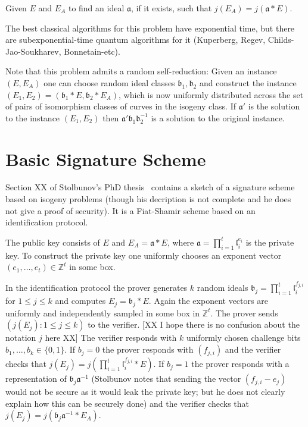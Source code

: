 \documentclass{llncs}
\newcommand{\Z}{\mathbb{Z}}
\renewcommand{\a}{\mathfrak{a}}
\renewcommand{\b}{\mathfrak{b}}
\renewcommand{\l}{\mathfrak{l}}
\begin{document}
\begin{definition}\label{defn:ass1}
Given $E$ and $E_A$ to find an ideal $\a$, if it exists, such that $j( E_A ) = j( \a * E )$.
\end{definition}

The best classical algorithms for this problem have exponential time, but there are subexponential-time quantum algorithms for it (Kuperberg, Regev, Childs-Jao-Soukharev, Bonnetain-etc).

Note that this problem admits a random self-reduction: Given an instance $(E, E_A)$ one can choose random ideal classes $\b_1, \b_2$ and construct the instance $(E_1, E_2) = (\b_1 * E, \b_2 * E_A )$, which is now uniformly distributed across the set of pairs of isomorphism classes of curves in the isogeny class.
If $\a'$ is the solution to the instance $(E_1, E_2)$ then $\a'\b_1 \b_2^{-1}$ is a solution to the original instance.


\section{Basic Signature Scheme}

Section XX of Stolbunov's PhD thesis~\cite{Sto12} contains a sketch of a signature scheme based on isogeny problems (though his decription is not complete and he does not give a proof of security).
It is a Fiat-Shamir scheme based on an identification protocol.

The public key consists of $E$ and $E_A = \a * E$, where $\a = \prod_{i=1}^t \l_i^{e_i}$ is the private key.
To construct the private key one uniformly chooses an exponent vector $(e_1, \dots, e_t) \in \Z^t$ in some box.

In the identification protocol the prover generates $k$ random ideals $\b_j = \prod_{i=1}^t \l_i^{f_{j,i}}$ for $1 \le j \le k$ and computes $E_j = \b_j * E$.
Again the exponent vectors are uniformly and independently sampled in some box in $\Z^t$.
The prover sends $(j( E_j ) : 1 \le j \le k )$ to the verifier.
[XX I hope there is no confusion about the notation $j$ here XX]
The verifier responds with $k$ uniformly chosen challenge bits $b_1, \dots, b_k \in \{0,1\}$.
If $b_j = 0$ the prover responds with $( f_{j,i} )$ and the verifier checks that $j(E_j) = j( \prod_{i=1}^t \l_i^{f_{j,i}} * E )$.
If $b_j = 1$ the prover responds with a representation of $\b_j \a^{-1}$ (Stolbunov notes that sending the vector $(f_{j,i} - e_j )$ would not be secure as it would leak the private key; but he does not clearly explain how this can be securely done) and the verifier checks that $j(E_j) = j( \b_j \a^{-1} * E_A )$.
\end{document}
